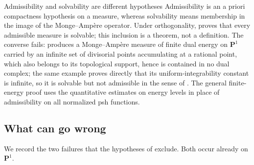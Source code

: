 \begin{warning}{Admissibility and solvability are different hypotheses}
Admissibility is an a priori compactness hypothesis on a measure, whereas
solvability means membership in the image of the Monge--Amp\`ere operator.
Under orthogonality,  proves that every
admissible measure is solvable; this inclusion is a theorem, not a
definition.  The converse fails:
 produces a Monge--Amp\`ere measure of
finite dual energy on $\mathbf P^1$ carried by an infinite set of divisorial points accumulating at a
rational point, which also belongs to its topological support, hence is contained in no
dual complex; the same example proves directly that its
uniform-integrability constant is infinite, so it is solvable but not
admissible in the sense of .  The general finite-energy proof uses the quantitative estimates on
energy levels in place of admissibility on all normalized psh functions.
\end{warning}

\subsection{What can go wrong}
\label{sec:ch28-what-goes-wrong}

We record the two failures that the hypotheses of
 exclude.  Both occur already on
$\mathbf P^1$.

